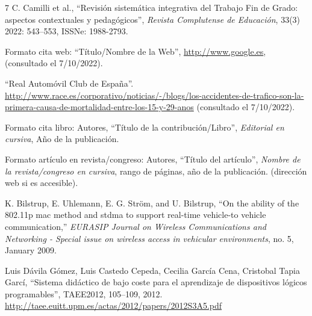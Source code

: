 \documentclass{memoriaTFG}
\begin{document}
\tableofcontents
\listoffigures

\mainmatter



\begin{thebibliography}{7}
  C. Camilli et al., “Revisión sistemática integrativa del Trabajo Fin de Grado: aspectos contextuales y pedagógicos”, \textit{Revista Complutense de Educación}, 33(3) 2022: 543--553, ISSNe: 1988-2793.

  Formato cita web: “Título/Nombre de la Web”, \url{http://www.google.es}, (consultado el 7/10/2022).

  “Real Automóvil Club de España”. \url{http://www.race.es/corporativo/noticias/-/blogs/los-accidentes-de-trafico-son-la-primera-causa-de-mortalidad-entre-los-15-y-29-anos} (consultado el 7/10/2022).

  Formato cita libro: Autores, “Título de la contribución/Libro”, \textit{Editorial en cursiva}, Año de la publicación.

  Formato artículo en revista/congreso: Autores, “Título del artículo”, \textit{Nombre de la revista/congreso en cursiva}, rango de páginas, año de la publicación. (dirección web si es accesible).

  K. Bilstrup, E. Uhlemann, E. G. Ström, and U. Bilstrup, “On the ability of the 802.11p mac method and stdma to support real-time vehicle-to vehicle communication,” \textit{EURASIP Journal on Wireless Communications and Networking - Special issue on wireless access in vehicular environments}, no. 5, January 2009.

  Luis Dávila Gómez, Luis Castedo Cepeda, Cecilia García Cena, Cristobal Tapia Garcí, “Sistema didáctico de bajo coste para el aprendizaje de dispositivos lógicos programables”, TAEE2012, 105--109, 2012. \url{http://taee.euitt.upm.es/actas/2012/papers/2012S3A5.pdf}
\end{thebibliography}
\end{document}
